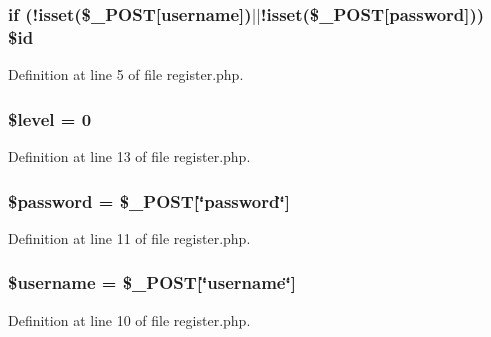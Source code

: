 \subsubsection[{\texorpdfstring{\$id}{$id}}]{\setlength{\rightskip}{0pt plus 5cm}if (!isset(\$\+\_\+\+P\+O\+ST\mbox{[}\textquotesingle{}username\textquotesingle{}\mbox{]})$\vert$$\vert$!isset(\$\+\_\+\+P\+O\+ST\mbox{[}\textquotesingle{}password\textquotesingle{}\mbox{]})) \$id}\hypertarget{register_8php_ac29a1612b7f8fa7b187dcf924a5e1368}{}\label{register_8php_ac29a1612b7f8fa7b187dcf924a5e1368}


Definition at line 5 of file register.\+php.

\subsubsection[{\texorpdfstring{\$level}{$level}}]{\setlength{\rightskip}{0pt plus 5cm}\$level = 0}\hypertarget{register_8php_abd32cc82c6a3f79491987de36ad580ca}{}\label{register_8php_abd32cc82c6a3f79491987de36ad580ca}


Definition at line 13 of file register.\+php.

\subsubsection[{\texorpdfstring{\$password}{$password}}]{\setlength{\rightskip}{0pt plus 5cm}\$password = \$\+\_\+\+P\+O\+ST\mbox{[}\char`\"{}password\char`\"{}\mbox{]}}\hypertarget{register_8php_a607686ef9f99ea7c42f4f3dd3dbb2b0d}{}\label{register_8php_a607686ef9f99ea7c42f4f3dd3dbb2b0d}


Definition at line 11 of file register.\+php.

\subsubsection[{\texorpdfstring{\$username}{$username}}]{\setlength{\rightskip}{0pt plus 5cm}\$username = \$\+\_\+\+P\+O\+ST\mbox{[}\char`\"{}username\char`\"{}\mbox{]}}\hypertarget{register_8php_a0eb82aa5f81cf845de4b36cd653c42cf}{}\label{register_8php_a0eb82aa5f81cf845de4b36cd653c42cf}


Definition at line 10 of file register.\+php.

